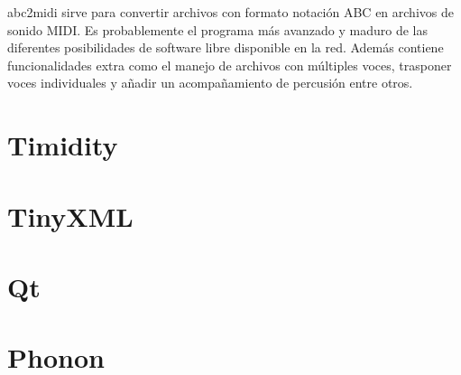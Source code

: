 abc2midi sirve para convertir archivos con formato notación ABC en archivos de sonido MIDI. Es probablemente el programa más avanzado y maduro de las diferentes posibilidades de software libre disponible en la red. Además contiene funcionalidades extra como el manejo de archivos con múltiples voces, trasponer voces individuales y añadir un acompañamiento de percusión entre otros.

\section{Timidity}
\label{sec:Timidity}

\section{TinyXML}
\label{sec:TinyXML}

\section{Qt}
\label{sec:Qt}

\section{Phonon}
\label{sec:Phonon}